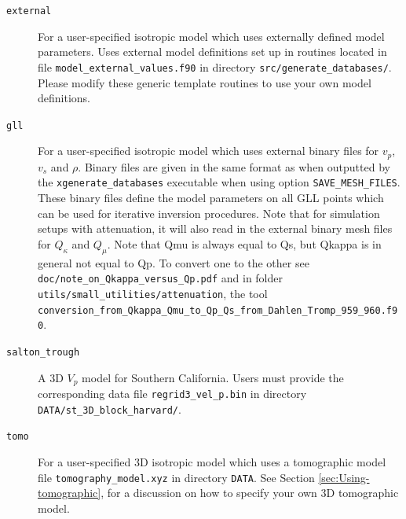 \begin{description}
\begin{description}
\begin{description}
\item [{\texttt{external}}] For a user-specified isotropic model which
uses externally defined model parameters. Uses external model definitions
set up in routines located in file \texttt{model\_external\_values.f90}
in directory \texttt{src/generate\_databases/}. Please modify these
generic template routines to use your own model definitions.

\item [{\texttt{gll}}] For a user-specified isotropic model which uses
external binary files for $v_{p}$, $v_{s}$ and $\rho$. Binary files
are given in the same format as when outputted by the \texttt{xgenerate\_databases}
executable when using option \texttt{SAVE\_MESH\_FILES}. These binary
files define the model parameters on all GLL points which can be used
for iterative inversion procedures. Note that for simulation setups with attenuation,
it will also read in the external binary mesh files for $Q_{\kappa}$ and $Q_{\mu}$.
Note that Qmu is always equal to Qs, but Qkappa is in general not equal to Qp.
To convert one to the other see \texttt{doc/note\_on\_Qkappa\_versus\_Qp.pdf}
and in folder \texttt{utils/small\_utilities/attenuation}, the tool
\texttt{conversion\_from\_Qkappa\_Qmu\_to\_Qp\_Qs\_from\_Dahlen\_Tromp\_959\_960.f90}.


\item [{\texttt{salton\_trough}}] A 3D $V_{p}$ model for Southern California.
Users must provide the corresponding data file \texttt{regrid3\_vel\_p.bin}
in directory \texttt{DATA/st\_3D\_block\_harvard/}.

\item [{\texttt{tomo}}] For a user-specified 3D isotropic model which uses
a tomographic model file \texttt{tomography\_model.xyz} in directory
\texttt{DATA}. See Section \ref{sec:Using-tomographic}, for a discussion
on how to specify your own 3D tomographic model.
\end{description}


\end{description}


\end{description}
